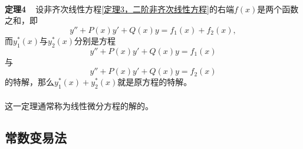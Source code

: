 \paragraph{}
\textbf{定理4~~}设非齐次线性方程\eqref{定理3，二阶非齐次线性方程}的右端$f(x)$是两个函数之和，即
\begin{equation}
  y'' + P(x)y' + Q(x)y = f_1(x) + f_2(x),
\end{equation}
而$y_1^*(x)$与$y_2^*(x)$分别是方程
\begin{equation*}
  y'' + P(x)y' + Q(x)y = f_1(x)
\end{equation*}
与
\begin{equation*}
  y'' + P(x)y' + Q(x)y = f_2(x)
\end{equation*}
的特解，那么$y_1^*(x)+y_2^*(x)$就是原方程的特解。
\paragraph{}
这一定理通常称为线性微分方程的解的。

\subsection{常数变易法}
\paragraph{}
